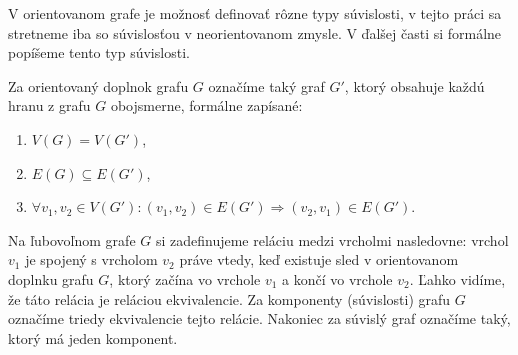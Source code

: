 V orientovanom grafe je možnosť definovať rôzne typy súvislosti, v tejto práci sa stretneme iba
so súvislosťou v neorientovanom zmysle. V ďalšej časti si formálne popíšeme tento typ súvislosti.

Za orientovaný doplnok grafu $G$ označíme taký graf $G'$,
ktorý obsahuje každú hranu z grafu $G$ obojsmerne, formálne zapísané:
\begin{enumerate}
    \item $V(G) = V(G')$,
    \item $E(G) \subseteq E(G')$,
    \item $\forall v_1, v_2 \in V(G') : (v_1, v_2) \in E(G') \Rightarrow (v_2, v_1) \in E(G')$.
\end{enumerate}

Na ľubovoľnom grafe $G$ si zadefinujeme reláciu medzi vrcholmi nasledovne: vrchol $v_1$ je spojený
s vrcholom $v_2$ práve vtedy, keď existuje sled v orientovanom doplnku grafu $G$, ktorý začína vo 
vrchole $v_1$ a končí vo vrchole $v_2$. Ľahko vidíme, že táto relácia je reláciou ekvivalencie.
Za komponenty (súvislosti) grafu $G$ označíme triedy ekvivalencie tejto relácie. Nakoniec za súvislý graf
označíme taký, ktorý má jeden komponent.



